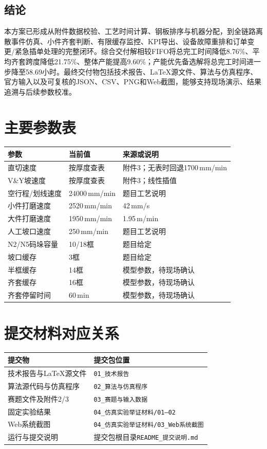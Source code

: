 \documentclass[UTF8,zihao=-4,openany]{ctexrep}
\newcommand{\code}[1]{\texttt{#1}}
\begin{document}
\section{结论}

本方案已形成从附件数据校验、工艺时间计算、钢板排序与机器分配，到全链路离散事件仿真、小件齐套判断、有限缓存监控、KPI导出、设备故障重排和订单变更/紧急插单处理的完整闭环。综合交付解相较FIFO将总完工时间降低8.76\%、平均齐套跨度降低21.75\%、整体产能提高9.60\%；产能优先备选解将总完工时间进一步降至58.69小时。最终交付物包括技术报告、LaTeX源文件、算法与仿真程序、官方输入以及可复核的JSON、CSV、PNG和Web截图，能够支持现场演示、结果追溯与后续参数校准。

\appendix
\chapter{主要参数表}

\begin{longtable}{p{}p{}p{}}
\toprule
参数 & 当前值 & 来源或说明 \\
\midrule
直切速度 & 按厚度查表 & 附件3；无表时回退1700\,mm/min \\
V\&Y坡速度 & 按厚度查表 & 附件3；线性插值 \\
空行程/划线速度 & 24000\,mm/min & 题目工艺说明 \\
小件打磨速度 & 2520\,mm/min & 42\,mm/s \\
大件打磨速度 & 1950\,mm/min & 1.95\,m/min \\
人工坡口速度 & 250\,mm/min & 题目工艺说明 \\
N2/N5码垛容量 & 10/18框 & 题目给定 \\
坡口缓存 & 3框 & 题目给定 \\
半框缓存 & 14框 & 模型参数，待现场确认 \\
齐套缓存 & 16框 & 模型参数，待现场确认 \\
齐套停留时间 & 60\,min & 模型参数，待现场确认 \\
\bottomrule
\end{longtable}

\chapter{提交材料对应关系}

\begin{table}[H]
\centering
\begin{tabularx}{\textwidth}{p{}Y}
\toprule
提交物 & 提交包位置 \\
\midrule
技术报告与LaTeX源文件 & \code{01\_技术报告} \\
算法源代码与仿真程序 & \code{02\_算法与仿真程序} \\
赛题文件及附件2/3 & \code{03\_赛题与输入数据} \\
固定实验结果 & \code{04\_仿真实验举证材料/01--02} \\
Web系统截图 & \code{04\_仿真实验举证材料/03\_Web系统截图} \\
运行与提交说明 & 提交包根目录\code{README\_提交说明.md} \\
\bottomrule
\end{tabularx}
\end{table}
\end{document}
